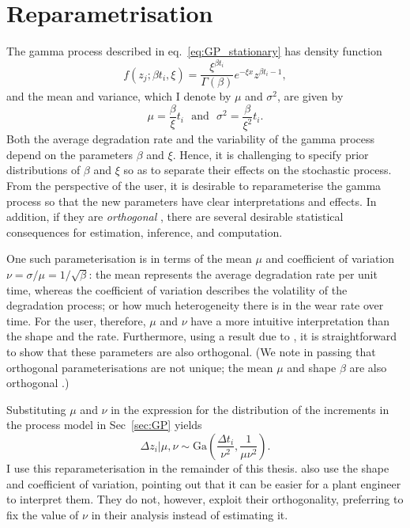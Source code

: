 \section{Reparametrisation} \label{sec:GP-reparameterisation}

The gamma process described in eq.~\eqref{eq:GP_stationary} has density function
\begin{equation}
  \label{eq:GamDist}
  f(z_j; \beta t_i, \xi) = \frac{\xi^{\beta t_i}}{\Gamma(\beta)} e^{-\xi x} z^{\beta t_i - 1}, 
\end{equation}
and the mean and variance, which I denote by $\mu$ and $\sigma^2$, are given by
\begin{equation}
  \label{eq:GamProp}
  \mu = \frac{\beta}{\xi}t_i \,\,\,\,\mbox{and}\,\,\,\,\sigma^2 = \frac{\beta}{\xi^2}t_i.
\end{equation}
Both the average degradation rate and the variability of the gamma process depend on the parameters $\beta$ and $\xi$. Hence, it is challenging to specify prior distributions of $\beta$ and $\xi$ so as to separate their effects on the stochastic process. From the perspective of the user, it is desirable to reparameterise the gamma process so that the new parameters have clear interpretations and effects. In addition, if they are \emph{orthogonal} \citep{cox1987}, there are several desirable statistical consequences for estimation, inference, and computation.

One such parameterisation is in terms of the mean $\mu$ and coefficient of variation $\nu = \sigma/\mu = 1/\sqrt{\beta}$: the mean represents the average degradation rate per unit time, whereas the coefficient of variation describes the volatility of the degradation process; or how much heterogeneity there is in the wear rate over time. For the user, therefore, $\mu$ and $\nu$ have a more intuitive interpretation than the shape and the rate. Furthermore, using a result due to \citet{huzurbazar1956}, it is straightforward to show that these parameters are also orthogonal. (We note in passing that orthogonal parameterisations are not unique; the mean $\mu$ and shape $\beta$ are also orthogonal \citep{huzurbazar1956}.)

Substituting $\mu$ and $\nu$ in the expression for the distribution of the increments in the process model in Sec~\ref{sec:GP} yields
\begin{equation} 
  \label{eq:GP_stationary_reparam}
  \Delta z_i|\mu, \nu \sim \mbox{Ga} \left( \frac{\Delta t_i}{\nu^2}, \frac{1}{\mu \nu^2} \right).
\end{equation}
I use this reparameterisation in the remainder of this thesis. \citet{kallen2005} also use the shape and coefficient of variation, pointing out that it can be easier for a plant engineer to interpret them. They do not, however, exploit their orthogonality, preferring to fix the value of $\nu$ in their analysis instead of estimating it.

